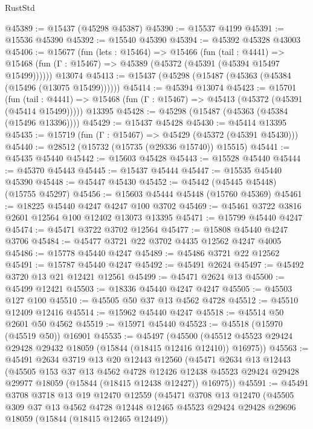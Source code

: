 \begin{lexlean}{RustStd}
\begin{coremodule}
@45389 := @15437 (@45298 @45387)
@45390 := @15537 @4199
@45391 := @15536 @45390
@45392 := @15540 @45390
@45394 := @45392 @45328 @43003
@45406 := @15677
    (fun (lets : @15464) =>
    @15466
      (fun (tail : @4441) =>
      @15468 (fun (Γ : @15467) => @45389 (@45372 (@45391 (@45394 @15497 @15499))))))
    @13074
@45413 := @15437 (@45298 (@15487 (@45363 (@45384 (@15496 (@13075 @15499))))))
@45414 := @45394 @13074
@45423 := @15701
    (fun (tail : @4441) => @15468 (fun (Γ : @15467) => @45413 (@45372 (@45391 (@45414 @15499)))))
    @13395
@45428 := @45298 (@15487 (@45363 (@45384 (@15496 @13396))))
@45429 := @15437 @45428
@45430 := @45414 @13395
@45435 := @15719 (fun (Γ : @15467) => @45429 (@45372 (@45391 @45430)))
@45440 := @28512 (@15732 (@15735 (@29336 @15740)) @15515)
@45441 := @45435 @45440
@45442 := @15603 @45428
@45443 := @15528 @45440
@45444 := @45370 @45443
@45445 := @15437 @45444
@45447 := @15535 @45440 @45390
@45448 := @45447 @45430
@45452 := @45442 (@45445 @45448) (@15755 @45297)
@45456 := @15603 @45444 @45448 (@15760 @45369)
@45461 := @18225 @45440 @4247 @4247 @100 @3702
@45469 := @45461 @3722 @3816 @2601 @12564 @100 @12402 @13073 @13395
@45471 := @15799 @45440 @4247
@45474 := @45471 @3722 @3702 @12564
@45477 := @15808 @45440 @4247 @3706
@45484 := @45477 @3721 @22 @3702 @4435 @12562 @4247 @4005
@45486 := @15778 @45440 @4247
@45489 := @45486 @3721 @22 @12562
@45491 := @15787 @45440 @4247
@45492 := @45491 @2624
@45497 := @45492 @3720 @13 @21 @12421 @12561
@45499 := @45471 @2624 @13
@45500 := @45499 @12421
@45503 := @18336 @45440 @4247 @4247
@45505 := @45503 @127 @100
@45510 := @45505 @50 @37 @13 @4562 @4728
@45512 := @45510 @12409 @12416
@45514 := @15962 @45440 @4247
@45518 := @45514 @50 @2601 @50 @4562
@45519 := @15971 @45440
@45523 := @45518 (@15970 (@45519 @50)) @16901
@45535 := @45497
    (@45500 (@45512 @45523 @29424 @29428 @29432 @18059 (@15844 (@18415 @12416 @12410)) @16975))
@45563 := @45491
    @2634
    @3719
    @13
    @20
    @12443
    @12560
    (@45471
      @2634
      @13
      @12443
      (@45505
        @153
        @37
        @13
        @4562
        @4728
        @12426
        @12438
        @45523
        @29424
        @29428
        @29977
        @18059
        (@15844 (@18415 @12438 @12427))
        @16975))
@45591 := @45491
    @3708
    @3718
    @13
    @19
    @12470
    @12559
    (@45471
      @3708
      @13
      @12470
      (@45505
        @309
        @37
        @13
        @4562
        @4728
        @12448
        @12465
        @45523
        @29424
        @29428
        @29696
        @18059
        (@15844 (@18415 @12465 @12449))

\end{coremodule}
\end{lexlean}
